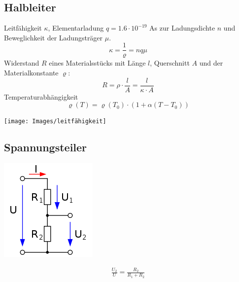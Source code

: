 \subsection{Halbleiter}
Leitfähigkeit $\kappa$, Elementarladung $q = 1.6\cdot10^{-19}$ As zur Ladungsdichte $n$ und Beweglichkeit der Ladungsträger $\mu$.
\[
\kappa = \frac{1}{\varrho} = nq\mu
\]
Widerstand $R$ eines Materialsstücks mit Länge $l$, Querschnitt $A$ und der Materialkonstante $\varrho$:
\[
R = \rho \cdot \frac{l}{A} = \frac{l}{\kappa \cdot A}
\]
Temperaturabhängigkeit
\[
\varrho(T) = \varrho(T_0) \cdot (1 + \alpha(T - T_0))
\]

\texttt{[image: Images/leitfähigkeit]}

\subsection{Spannungsteiler}
\begin{minipage}{0.20\textwidth}
	\includegraphics[width=\linewidth,keepaspectratio=true]{./Images/spannungsteiler}
\end{minipage}%
\begin{minipage}{0.30\textwidth}
	\begin{align*}
		\frac{U_2}{U} = \frac{R_2}{R_1 + R_2}
	\end{align*}
\end{minipage}

